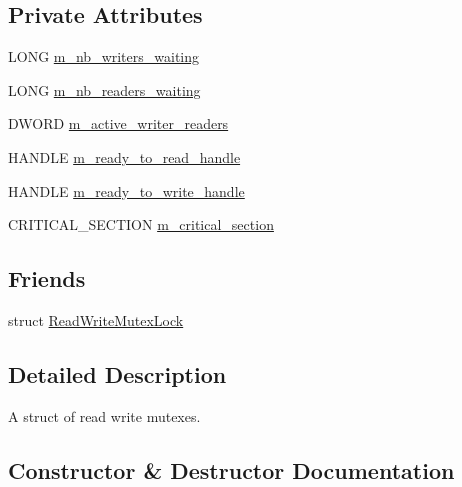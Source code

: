 \subsection*{Private Attributes}
\begin{DoxyCompactItemize}
\item 
L\+O\+NG \hyperlink{structmage_1_1_read_write_mutex_a003313794a9b43f80bd9b258b039438d}{m\+\_\+nb\+\_\+writers\+\_\+waiting}
\item 
L\+O\+NG \hyperlink{structmage_1_1_read_write_mutex_acbe7553fff7cca2656f6f2b8f0471484}{m\+\_\+nb\+\_\+readers\+\_\+waiting}
\item 
D\+W\+O\+RD \hyperlink{structmage_1_1_read_write_mutex_a1e0ad98e517236170faae5b27decfdce}{m\+\_\+active\+\_\+writer\+\_\+readers}
\item 
H\+A\+N\+D\+LE \hyperlink{structmage_1_1_read_write_mutex_a65c0ef8b687d48104b09a9d175e72236}{m\+\_\+ready\+\_\+to\+\_\+read\+\_\+handle}
\item 
H\+A\+N\+D\+LE \hyperlink{structmage_1_1_read_write_mutex_a9498ef85b52486342ba657f34369f89e}{m\+\_\+ready\+\_\+to\+\_\+write\+\_\+handle}
\item 
C\+R\+I\+T\+I\+C\+A\+L\+\_\+\+S\+E\+C\+T\+I\+ON \hyperlink{structmage_1_1_read_write_mutex_a77fe51b87e5205d60ea045fa53bc1fa3}{m\+\_\+critical\+\_\+section}
\end{DoxyCompactItemize}
\subsection*{Friends}
\begin{DoxyCompactItemize}
\item 
struct \hyperlink{structmage_1_1_read_write_mutex_a7ae207fc659160d3c55a5ba1468007f7}{Read\+Write\+Mutex\+Lock}
\end{DoxyCompactItemize}


\subsection{Detailed Description}
A struct of read write mutexes. 

\subsection{Constructor \& Destructor Documentation}
\hypertarget{structmage_1_1_read_write_mutex_aae10694de3862f2d1059477169883940}{}\label{structmage_1_1_read_write_mutex_aae10694de3862f2d1059477169883940} 
